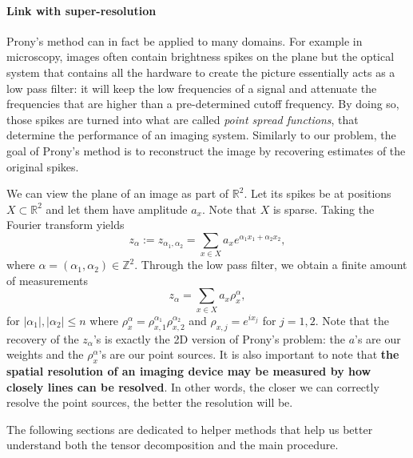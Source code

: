 \paragraph{Link with super-resolution} Prony's method can in fact be applied to many domains. For example in microscopy, images often contain brightness spikes on the plane but the optical system that contains all the hardware to create the picture essentially acts as a low pass filter: it will keep the low frequencies of a signal and attenuate the frequencies that are higher than a pre-determined cutoff frequency. By doing so, those spikes are turned into what are called \textit{point spread functions}, that determine the performance of an imaging system. Similarly to our problem, the goal of Prony's method is to reconstruct the image by recovering estimates of the original spikes.\par 
We can view the plane of an image as part of $\mathbb{R}^2$. Let its spikes be at positions $X\subset\mathbb{R}^2$ and let them have amplitude $a_x$. Note that $X$ is sparse. Taking the Fourier transform yields $$z_\alpha:=z_{\alpha_1,\alpha_2}=\sum_{x\in X}a_xe^{\alpha_1 x_1+\alpha_2 x_2},$$ where $\alpha=(\alpha_1,\alpha_2)\in\mathbb{Z}^2$. Through the low pass filter, we obtain a finite amount of measurements $$z_\alpha=\sum_{x\in X}a_x\rho_x^\alpha,$$ for $|\alpha_1|,|\alpha_2|\leq n$ where $\rho_x^\alpha=\rho_{x,1}^{\alpha_1}\rho_{x,2}^{\alpha_2}$ and $\rho_{x,j}=e^{ix_j}$ for $j=1,2$. Note that the recovery of the $z_\alpha$'s is exactly the 2D version of Prony's problem: the $a$'s are our weights and the $\rho_x^\alpha$'s are our point sources. It is also important to  note that {\bf the spatial resolution of an imaging device may be measured by how closely lines can be resolved}. In other words, the closer we can correctly resolve the point sources, the better the resolution will be.\par 
The following sections are dedicated to helper methods that help us better understand both the tensor decomposition and the main procedure.
